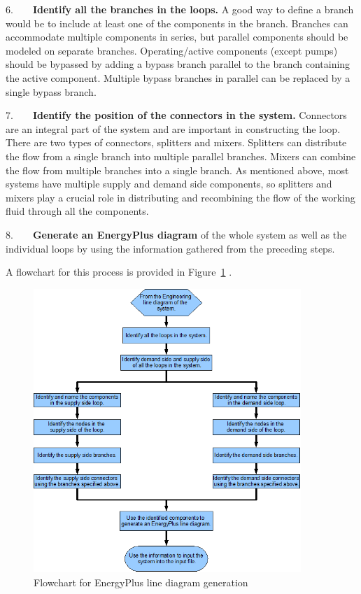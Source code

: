 6.~~~~\textbf{Identify all the branches in the loops.} A good way to define a branch would be to include at least one of the components in the branch. Branches can accommodate multiple components in series, but parallel components should be modeled on separate branches. Operating/active components (except pumps) should be bypassed by adding a bypass branch parallel to the branch containing the active component. Multiple bypass branches in parallel can be replaced by a single bypass branch.

7.~~~~\textbf{Identify the position of the connectors in the system.} Connectors are an integral part of the system and are important in constructing the loop. There are two types of connectors, splitters and mixers. Splitters can distribute the flow from a single branch into multiple parallel branches. Mixers can combine the flow from multiple branches into a single branch. As mentioned above, most systems have multiple supply and demand side components, so splitters and mixers play a crucial role in distributing and recombining the flow of the working fluid through all the components.

8.~~~~\textbf{Generate an EnergyPlus diagram} of the whole system as well as the individual loops by using the information gathered from the preceding steps.

A flowchart for this process is provided in Figure~\ref{fig:flowchart-for-energyplus-line-diagram} .

\begin{figure}[hbtp] %
\centering
\includegraphics[width=0.9\textwidth, height=0.9\textheight, keepaspectratio=true]{media/image002.png}
\caption{Flowchart for EnergyPlus line diagram generation \protect \label{fig:flowchart-for-energyplus-line-diagram}}
\end{figure}
